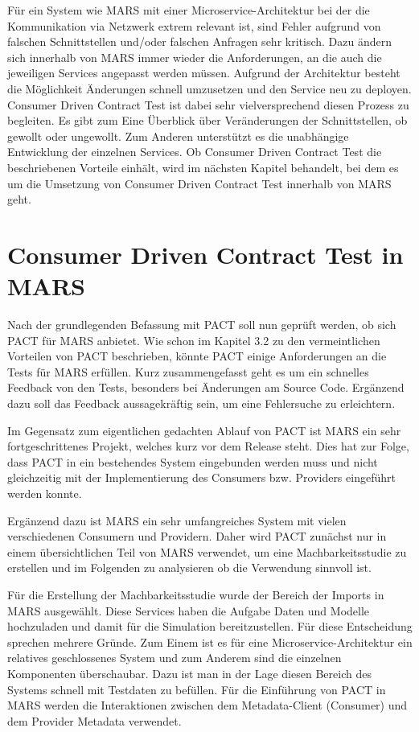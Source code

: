 \documentclass{llncs}
\begin{document}
Für ein System wie MARS mit einer Microservice-Architektur bei der die Kommunikation via Netzwerk extrem relevant ist, sind Fehler aufgrund von falschen Schnittstellen und/oder falschen Anfragen sehr kritisch. Dazu ändern sich innerhalb von MARS immer wieder die Anforderungen, an die auch die jeweiligen Services angepasst werden müssen. Aufgrund der Architektur besteht die Möglichkeit Änderungen schnell umzusetzen und den Service neu zu deployen. Consumer Driven Contract Test ist dabei sehr vielversprechend diesen Prozess zu begleiten. Es gibt zum Eine Überblick über Veränderungen der Schnittstellen, ob gewollt oder ungewollt. Zum Anderen unterstützt es die unabhängige Entwicklung der einzelnen Services. Ob Consumer Driven Contract Test die beschriebenen Vorteile einhält, wird im nächsten Kapitel behandelt, bei dem es um die Umsetzung von Consumer Driven Contract Test innerhalb von MARS geht.

\section{Consumer Driven Contract Test in MARS}
Nach der grundlegenden Befassung mit PACT soll nun geprüft werden, ob sich PACT für MARS anbietet. Wie schon im Kapitel 3.2 zu den vermeintlichen Vorteilen von PACT beschrieben, könnte PACT einige Anforderungen an die Tests für MARS erfüllen.
Kurz zusammengefasst geht es um ein schnelles Feedback von den Tests, besonders bei Änderungen am Source Code. Ergänzend dazu soll das Feedback aussagekräftig sein, um eine Fehlersuche zu erleichtern.

Im Gegensatz zum eigentlichen gedachten Ablauf von PACT ist MARS ein sehr fortgeschrittenes Projekt, welches kurz vor dem Release steht. Dies hat zur Folge, dass PACT in ein bestehendes System eingebunden werden muss und nicht gleichzeitig mit der Implementierung des Consumers bzw. Providers eingeführt werden konnte.

Ergänzend dazu ist MARS ein sehr umfangreiches System mit vielen verschiedenen Consumern und Providern. Daher wird PACT zunächst nur in einem übersichtlichen Teil von MARS verwendet, um eine Machbarkeitsstudie zu erstellen und im Folgenden zu analysieren ob die Verwendung sinnvoll ist.

Für die Erstellung der Machbarkeitsstudie wurde der Bereich der Imports in MARS ausgewählt. Diese Services haben die Aufgabe Daten und Modelle hochzuladen und damit für die Simulation bereitzustellen. Für diese Entscheidung sprechen mehrere Gründe. Zum Einem ist es für eine Microservice-Architektur ein relatives geschlossenes System und zum Anderem sind die einzelnen Komponenten überschaubar. Dazu ist man in der Lage diesen Bereich des Systems schnell mit Testdaten zu befüllen. Für die Einführung von PACT in MARS werden die Interaktionen zwischen dem Metadata-Client (Consumer) und dem Provider Metadata verwendet.
\end{document}

